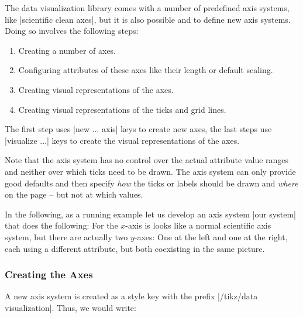 The data visualization library comes with a number of predefined axis
systems, like |scientific clean axes|, but it is also possible and
to define new axis systems. Doing so involves the following steps:

\begin{enumerate}
\item Creating a number of axes.
\item Configuring attributes of these axes like their length or
  default scaling.
\item Creating visual representations of the axes.
\item Creating visual representations of the ticks and grid lines.
\end{enumerate}

The first step uses |new ... axis| keys to create new axes, the
last steps use |visualize ...| keys to create the visual
representations of the axes.

Note that the axis system has no control over the actual attribute
value ranges and neither over which ticks need to be drawn. The axis
system can only provide good defaults and then specify \emph{how} the
ticks or labels should be drawn and \emph{where} on the page -- but
not at which values.

In the following, as a running example let us develop an axis system
|our system| that does the following: For the $x$-axis is looks like a
normal scientific axis system, but there are actually two $y$-axes:
One at the left and one at the right, each using a different
attribute, but both coexisting in the same picture.

\subsubsection{Creating the Axes}

A new axis system is created as a style key with the prefix
|/tikz/data visualization|. Thus, we would write:
\begin{codeexample}
\end{codeexample}

